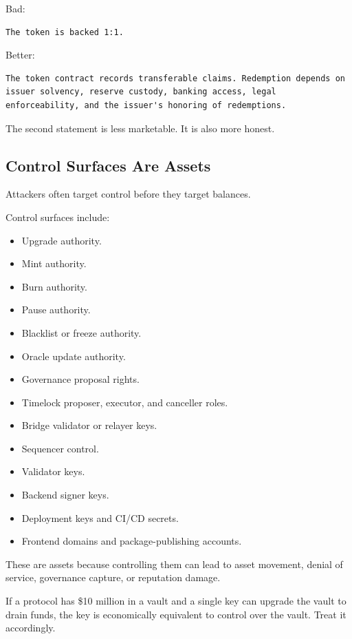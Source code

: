 Bad:

\begin{lstlisting}
The token is backed 1:1.
\end{lstlisting}

Better:

\begin{lstlisting}
The token contract records transferable claims. Redemption depends on issuer solvency, reserve custody, banking access, legal enforceability, and the issuer's honoring of redemptions.
\end{lstlisting}

The second statement is less marketable. It is also more honest.

\subsection{Control Surfaces Are Assets}

Attackers often target control before they target balances.

Control surfaces include:

\begin{itemize}
\tightlist
\item
  Upgrade authority.
\item
  Mint authority.
\item
  Burn authority.
\item
  Pause authority.
\item
  Blacklist or freeze authority.
\item
  Oracle update authority.
\item
  Governance proposal rights.
\item
  Timelock proposer, executor, and canceller roles.
\item
  Bridge validator or relayer keys.
\item
  Sequencer control.
\item
  Validator keys.
\item
  Backend signer keys.
\item
  Deployment keys and CI/CD secrets.
\item
  Frontend domains and package-publishing accounts.
\end{itemize}

These are assets because controlling them can lead to asset movement,
denial of service, governance capture, or reputation damage.

If a protocol has \$10 million in a vault and a single key can upgrade
the vault to drain funds, the key is economically equivalent to control
over the vault. Treat it accordingly.

